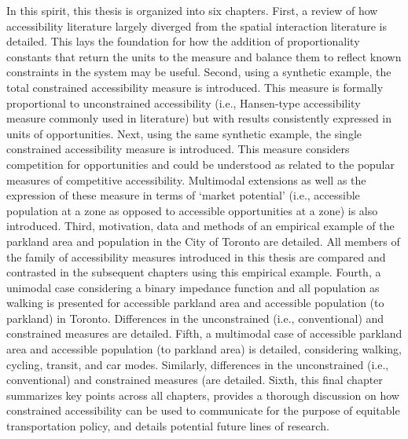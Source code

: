 \documentclass[
11pt, %
oneside, %
english, %
singlespacing, %
]{macthesis} %
\def\blankpage{%
      \clearpage%
      \thispagestyle{empty}%
      \addtocounter{page}{-1}%
      \null%
      \clearpage}
\begin{document}
In this spirit, this thesis is organized into six chapters. First, a review of how accessibility literature largely diverged from the spatial interaction literature is detailed. This lays the foundation for how the addition of proportionality constants that return the units to the measure and balance them to reflect known constraints in the system may be useful. Second, using a synthetic example, the total constrained accessibility measure is introduced. This measure is formally proportional to unconstrained accessibility (i.e., Hansen-type accessibility measure commonly used in literature) but with results consistently expressed in units of opportunities. Next, using the same synthetic example, the single constrained accessibility measure is introduced. This measure considers competition for opportunities and could be understood as related to the popular measures of competitive accessibility. Multimodal extensions as well as the expression of these measure in terms of `market potential' (i.e., accessible population at a zone as opposed to accessible opportunities at a zone) is also introduced. Third, motivation, data and methods of an empirical example of the parkland area and population in the City of Toronto are detailed. All members of the family of accessibility measures introduced in this thesis are compared and contrasted in the subsequent chapters using this empirical example. Fourth, a unimodal case considering a binary impedance function and all population as walking is presented for accessible parkland area and accessible population (to parkland) in Toronto. Differences in the unconstrained (i.e., conventional) and constrained measures are detailed. Fifth, a multimodal case of accessible parkland area and accessible population (to parkland area) is detailed, considering walking, cycling, transit, and car modes. Similarly, differences in the unconstrained (i.e., conventional) and constrained measures (are detailed. Sixth, this final chapter summarizes key points across all chapters, provides a thorough discussion on how constrained accessibility can be used to communicate for the purpose of equitable transportation policy, and details potential future lines of research.
\blankpage
\clearpage

\end{document}
